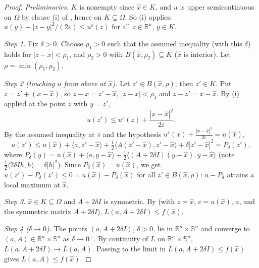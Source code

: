 \begin{proof}
\emph{Preliminaries.} $K$ is nonempty since $\hat x\in K$, and $u$ is upper semicontinuous on $\Omega$ by clause (i) of , hence on $K\subseteq\Omega$. So (i) applies: $u(y)-|z-y|^2/(2\varepsilon)\le u^\varepsilon(z)$ for all $z\in\mathbb R^n$, $y\in K$.

\emph{Step 1.} Fix $\delta>0$. Choose $\rho_1>0$ such that the assumed inequality (with this $\delta$) holds for $|z-x|<\rho_1$, and $\rho_2>0$ with $B(\hat x,\rho_2)\subseteq K$ ($\hat x$ is interior). Let $\rho=\min(\rho_1,\rho_2)$.

\emph{Step 2 (touching $u$ from above at $\hat x$).} Let $z'\in B(\hat x,\rho)$; then $z'\in K$. Put $z=z'+(x-\hat x)$, so $z-x=z'-\hat x$, $|z-x|<\rho_1$ and $z-z'=x-\hat x$. By (i) applied at the point $z$ with $y=z'$,
\[
u(z')\le u^\varepsilon(z)+\frac{|x-\hat x|^2}{2\varepsilon}.
\]
By the assumed inequality at $z$ and the hypothesis $u^\varepsilon(x)+\frac{|x-\hat x|^2}{2\varepsilon}=u(\hat x)$,
\[
u(z')\le u(\hat x)+\langle a,z'-\hat x\rangle+\tfrac12\langle A(z'-\hat x),z'-\hat x\rangle+\delta|z'-\hat x|^2
=P_\delta(z'),
\]
where $P_\delta(y)=u(\hat x)+\langle a,y-\hat x\rangle+\tfrac12\langle(A+2\delta I)(y-\hat x),y-\hat x\rangle$ (note $\frac12\langle 2\delta I h,h\rangle=\delta|h|^2$). Since $P_\delta(\hat x)=u(\hat x)$, we get $u(z')-P_\delta(z')\le0=u(\hat x)-P_\delta(\hat x)$ for all $z'\in B(\hat x,\rho)$: $u-P_\delta$ attains a local maximum at $\hat x$.

\emph{Step 3.} $\hat x\in K\subseteq\Omega$ and $A+2\delta I$ is symmetric. By  (with $z=\hat x$, $c=u(\hat x)$, $a$, and the symmetric matrix $A+2\delta I$), $L(a,A+2\delta I)\le f(\hat x)$.

\emph{Step 4 ($\delta\to0$).} The points $(a,A+2\delta I)$, $\delta>0$, lie in $\mathbb R^n\times\mathbb S^n$ and converge to $(a,A)\in\mathbb R^n\times\mathbb S^n$ as $\delta\to0^+$. By continuity of $L$ on $\mathbb R^n\times\mathbb S^n$, $L(a,A+2\delta I)\to L(a,A)$. Passing to the limit in $L(a,A+2\delta I)\le f(\hat x)$ gives $L(a,A)\le f(\hat x)$.
\end{proof}
